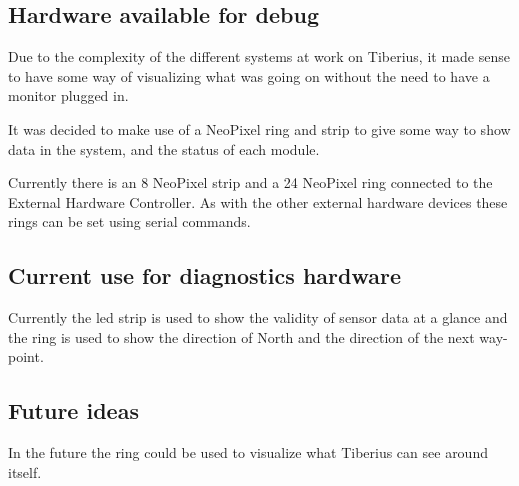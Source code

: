 \label{diagnostics}
\subsection{Hardware available for debug}
Due to the complexity of the different systems at work on Tiberius, it made sense to have some way of visualizing what was going on without the need to have a monitor plugged in.

It was decided to make use of a NeoPixel ring and strip to give some way to show data in the system, and the status of each module.

Currently there is an 8 NeoPixel strip and a 24 NeoPixel ring connected to the External Hardware Controller. As with the other external hardware devices these rings can be set using serial commands.

\subsection{Current use for diagnostics hardware}
Currently the led strip is used to show the validity of sensor data at a glance and the ring is used to show the direction of North and the direction of the next way-point.
\subsection{Future ideas}
In the future the ring could be used to visualize what Tiberius can see around itself.
\pagestyle{euan}













